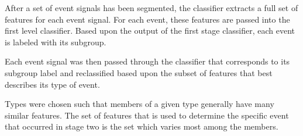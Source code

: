 After a set of event signals has been segmented, the classifier extracts a full set of 
features for each event signal. For each event, these features are passed into the first
level classifier. Based upon the output of the first stage classifier, each event is 
labeled with its subgroup.

Each event signal was then passed through the classifier that corresponds to its subgroup 
label and reclassified based upon the subset of features that best describes its type of
event. 

Types were chosen such that members of a given type generally have many similar features. 
The set of features that is used to determine the specific event that occurred in stage two
is the set which varies most among the members.
